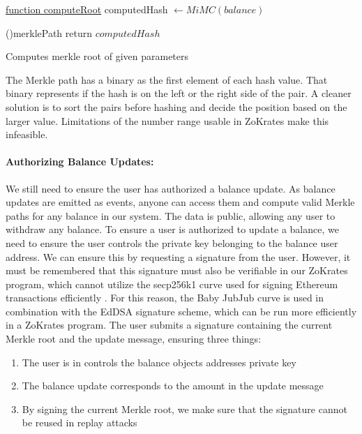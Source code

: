 \documentclass[../../thesis.tex]{subfiles}
\begin{document}
\begin{algorithm}

    \underline{function computeRoot}\;
    computedHash $\gets MiMC(balance)$

    \ForEach(){merklePath}
    {
    }
    return $computedHash$
    \caption{Computes merkle root of given parameters}
\end{algorithm}

The Merkle path has a binary as the first element of each hash value. That binary represents if the hash is on the left or the right side of the pair. A cleaner solution is to sort the pairs before hashing and decide the position based on the larger value. Limitations of the number range usable in ZoKrates make this infeasible.

\paragraph{Authorizing Balance Updates:}
We still need to ensure the user has authorized a balance update. As balance updates are emitted as events, anyone can access them and compute valid Merkle paths for any balance in our system. The data is public, allowing any user to withdraw any balance. To ensure a user is authorized to update a balance, we need to ensure the user controls the private key belonging to the balance user address. We can ensure this by requesting a signature from the user. However, it must be remembered that this signature must also be verifiable in our ZoKrates program, which cannot utilize the secp256k1 curve used for signing Ethereum transactions efficiently \cite{deml_2019}. For this reason, the Baby JubJub \cite{baylinaeddsa} curve is used in combination with the EdDSA signature scheme, which can be run more efficiently in a ZoKrates program. The user submits a signature containing the current Merkle root and the update message, ensuring three things:

\begin{enumerate}
    \item The user is in controls the balance objects addresses private key
    \item The balance update corresponds to the amount in the update message
    \item By signing the current Merkle root, we make sure that the signature cannot be reused in replay attacks
\end{enumerate}
\end{document}
